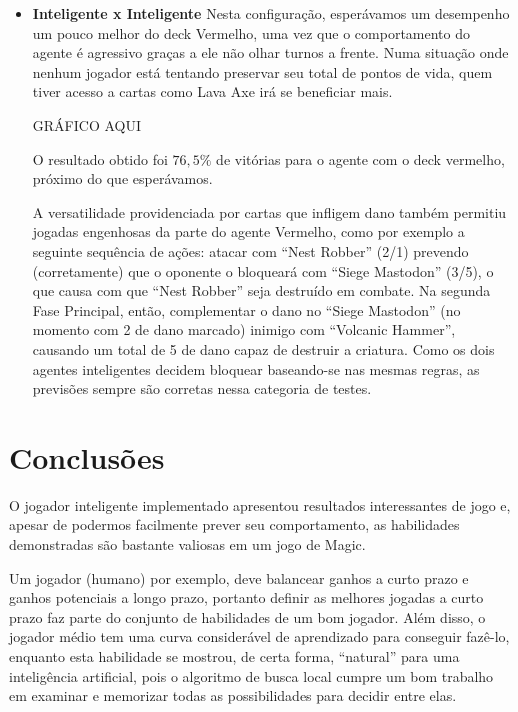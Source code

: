 \begin{itemize}
\item \textbf{Inteligente x Inteligente}
Nesta configuração, esperávamos um desempenho um pouco melhor do deck Vermelho, uma vez que o comportamento do agente é agressivo graças a ele não olhar turnos a frente. Numa situação onde nenhum jogador está tentando preservar seu total de pontos de vida, quem tiver acesso a cartas como Lava Axe irá se beneficiar mais.

GRÁFICO AQUI

O resultado obtido foi $76,5\%$ de vitórias para o agente com o deck vermelho, próximo do que esperávamos.

A versatilidade providenciada por cartas que infligem dano também permitiu jogadas engenhosas da parte do agente Vermelho, como por exemplo a seguinte sequência de ações: atacar com ``Nest Robber'' (2/1) prevendo (corretamente) que o oponente o bloqueará com ``Siege Mastodon'' (3/5), o que causa com que ``Nest Robber'' seja destruído em combate. Na segunda Fase Principal, então, complementar o dano no ``Siege Mastodon'' (no momento com 2 de dano marcado) inimigo com ``Volcanic Hammer'', causando um total de 5 de dano capaz de destruir a criatura. Como os dois agentes inteligentes decidem bloquear baseando-se nas mesmas regras, as previsões sempre são corretas nessa categoria de testes.

\end{itemize}

\section{Conclusões}
O jogador inteligente implementado apresentou resultados interessantes de jogo e, apesar de podermos facilmente prever seu comportamento, as habilidades demonstradas são bastante valiosas em um jogo de Magic.

Um jogador (humano) por exemplo, deve balancear ganhos a curto prazo e ganhos potenciais a longo prazo, portanto definir as melhores jogadas a curto prazo faz parte do conjunto de habilidades de um bom jogador. Além disso, o jogador médio tem uma curva considerável de aprendizado para conseguir fazê-lo, enquanto esta habilidade se mostrou, de certa forma, ``natural'' para uma inteligência artificial, pois o algoritmo de busca local cumpre um bom trabalho em examinar e memorizar todas as possibilidades para decidir entre elas.

